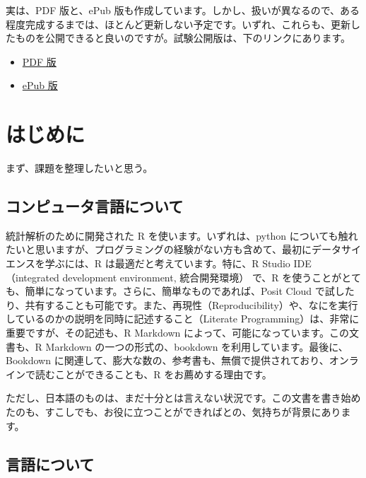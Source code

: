 \documentclass[
]{book}
\providecommand{\tightlist}{%
  \setlength{\itemsep}{0pt}\setlength{\parskip}{0pt}}
\theoremstyle{definition}
\theoremstyle{definition}
\theoremstyle{definition}
\theoremstyle{definition}
\theoremstyle{remark}
\begin{document}
実は、PDF 版と、ePub 版も作成しています。しかし、扱いが異なるので、ある程度完成するまでは、ほとんど更新しない予定です。いずれ、これらも、更新したものを公開できると良いのですが。試験公開版は、下のリンクにあります。

\begin{itemize}
\tightlist
\item
  \href{https://icu-hsuzuki.github.io/ds4aj/ds4aj.pdf}{PDF 版}
\item
  \href{https://icu-hsuzuki.github.io/ds4aj/ds4aj.epub}{ePub 版}
\end{itemize}

\hypertarget{introduction}{%
\chapter{はじめに}\label{introduction}}

まず、課題を整理したいと思う。

\hypertarget{ux30b3ux30f3ux30d4ux30e5ux30fcux30bfux8a00ux8a9eux306bux3064ux3044ux3066}{%
\section*{コンピュータ言語について}\label{ux30b3ux30f3ux30d4ux30e5ux30fcux30bfux8a00ux8a9eux306bux3064ux3044ux3066}}

統計解析のために開発された R を使います。いずれは、python についても触れたいと思いますが、プログラミングの経験がない方も含めて、最初にデータサイエンスを学ぶには、R は最適だと考えています。特に、R Studio IDE（integrated development environment, 統合開発環境） で、R を使うことがとても、簡単になっています。さらに、簡単なものであれば、Posit Cloud で試したり、共有することも可能です。また、再現性（Reproducibility）や、なにを実行しているのかの説明を同時に記述すること（Literate Programming）は、非常に重要ですが、その記述も、R Markdown によって、可能になっています。この文書も、R Markdown の一つの形式の、bookdown を利用しています。最後に、Bookdown に関連して、膨大な数の、参考書も、無償で提供されており、オンラインで読むことができることも、R をお薦めする理由です。

ただし、日本語のものは、まだ十分とは言えない状況です。この文書を書き始めたのも、すこしでも、お役に立つことができればとの、気持ちが背景にあります。

\hypertarget{ux8a00ux8a9eux306bux3064ux3044ux3066}{%
\section*{言語について}\label{ux8a00ux8a9eux306bux3064ux3044ux3066}}
\end{document}
